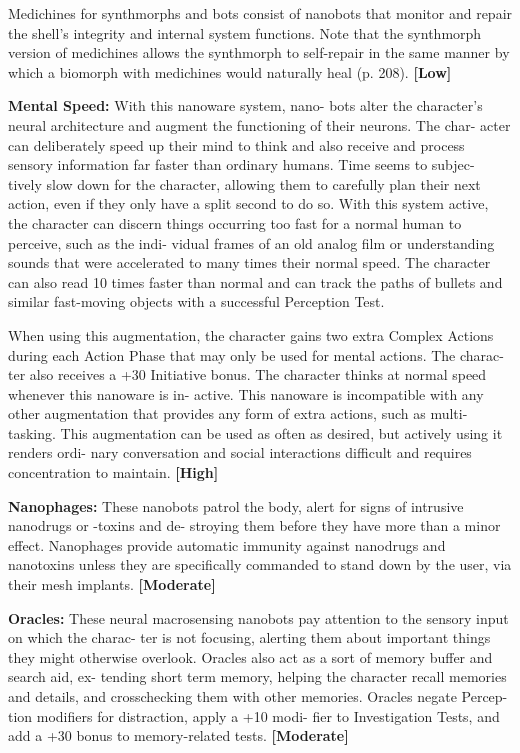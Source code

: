Medichines for synthmorphs and bots consist 
of nanobots that monitor and repair the shell's 
integrity and internal system functions. Note that 
the synthmorph version of medichines allows the 
synthmorph to self-repair in the same manner by 
which a biomorph with medichines would naturally 
heal (p. 208). \textbf{[Low]}

\textbf{Mental Speed: }With this nanoware system, nano-
bots alter the character's neural architecture and 
augment the functioning of their neurons. The char-
acter can deliberately speed up their mind to think 
and also receive and process sensory information far 
faster than ordinary humans. Time seems to subjec-
tively slow down for the character, allowing them 
to carefully plan their next action, even if they only 
have a split second to do so. With this system active, 
the character can discern things occurring too fast 
for a normal human to perceive, such as the indi-
vidual frames of an old analog film or understanding 
sounds that were accelerated to many times their 
normal speed. The character can also read 10 times 
faster than normal and can track the paths of bullets 
and similar fast-moving objects with a successful 
Perception Test.

When using this augmentation, the character gains 
two extra Complex Actions during each Action Phase 
that may only be used for mental actions. The charac-
ter also receives a +30 Initiative bonus. The character 
thinks at normal speed whenever this nanoware is in-
active. This nanoware is incompatible with any other 
augmentation that provides any form of extra actions, 
such as multi-tasking. This augmentation can be used 
as often as desired, but actively using it renders ordi-
nary conversation and social interactions difficult and 
requires concentration to maintain. \textbf{[High]}

\textbf{Nanophages:} These nanobots patrol the body, alert 
for signs of intrusive nanodrugs or -toxins and de-
stroying them before they have more than a minor 
effect. Nanophages provide automatic immunity 
against nanodrugs and nanotoxins unless they are 
specifically commanded to stand down by the user, via 
their mesh implants. \textbf{[Moderate]}

\textbf{Oracles: }These neural macrosensing nanobots pay 
attention to the sensory input on which the charac-
ter is not focusing, alerting them about important 
things they might otherwise overlook. Oracles also 
act as a sort of memory buffer and search aid, ex-
tending short term memory, helping the character 
recall memories and details, and crosschecking 
them with other memories. Oracles negate Percep-
tion modifiers for distraction, apply a +10 modi-
fier to Investigation Tests, and add a +30 bonus to 
memory-related tests. \textbf{[Moderate]}

